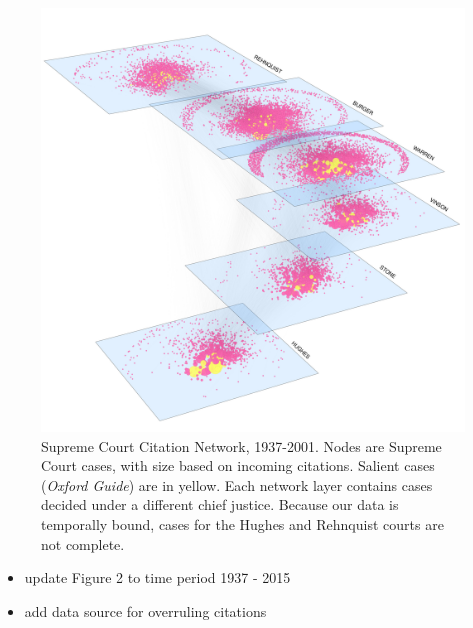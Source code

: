 \documentclass[headsepline=true, abstracton]{scrartcl}
\begin{document}
\begin{figure}[htp]
\includegraphics[scale=0.35,clip=true,trim=.5cm 0cm 0cm 2cm]{images/citations1}
\caption{ Supreme Court Citation Network, 1937-2001. Nodes are Supreme Court cases, with size based on incoming citations. Salient cases ({\em Oxford Guide}) are in yellow. Each network layer contains cases decided under a different chief justice. Because our data is temporally bound, cases for the Hughes and Rehnquist courts are not complete. }
 \label{fig:networkviz}
\vspace{-.25cm}
\end{figure}

\begin{itemize}
\item update Figure 2 to time period 1937 - 2015
\item add data source for overruling citations
\end{itemize}
  
\end{document}

